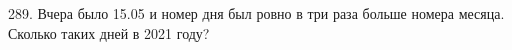 289. Вчера было 15.05 и номер дня был ровно в три раза больше номера месяца. Сколько таких дней в 2021 году?\\
